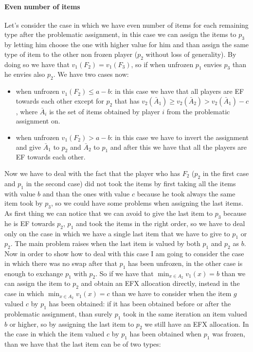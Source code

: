 \paragraph{Even number of items} Let's consider the case in which we have even number of items for each remaining type after the problematic assignment, in this case we can assign the items to $p_3$ by letting him choose the one with higher value for him and than assign the same type of item to the other non frozen player ($p_2$ without loss of generality). By doing so we have that $v_1(F_2) = v_1(F_3)$, so if when unfrozen $p_1$ envies $p_3$ than he envies also $p_2$. We have two cases now:
\begin{itemize}
\item when unfrozen $v_1(F_2) \le a-b$: in this case we have that all players are EF towards each other except for $p_2$ that has $v_2(\bar A_1) \ge v_2(\bar A_2)> v_2(\bar A_1) - c$, where $\bar A_i$ is the set of items obtained by player $i$ from the problematic assignment on.
\item when unfrozen $v_1(F_2) > a-b$: in this case we have to invert the assignment and give $\bar A_1$ to $p_2$ and $\bar A_2$ to $p_1$ and after this we have that all the players are EF towards each other.
\end{itemize}
Now we have to deal with the fact that the player who has $F_2$ ($p_2$ in the first case and $p_1$ in the second case) did not took the items by first taking all the items with value $b$ and than the ones with value $c$ because he took always the same item took by $p_3$, so we could have some problems when assigning the last items. As first thing we can notice that we can avoid to give the last item to $p_3$ because he is EF towards $p_2$, $p_1$  and took the items in the right order, so we have to deal only on the case in which we have a single last item that we have to give to $p_1$ or $p_2$. The main problem raises when the last item is valued by both $p_1$ and $p_2$ as $b$. Now in order to show how to deal with this case I am going to consider the case in which there was no swap after that $p_1$ has been unfrozen, in the other case is enough to exchange $p_1$ with $p_2$. So if we have that $\min_{x\in A_2} v_1(x) = b$ than we can assign the item to $p_2$ and obtain an EFX allocation directly, instead in the case in which $\min_{x\in A_2} v_1(x) = c$ than we have to consider when the item $g$ valued $c$ by $p_1$ has been obtained: if it has been obtained before or after the problematic assignment, than surely $p_1$ took in the same iteration an item valued $b$ or higher, so by assigning the last item to $p_2$ we still have an EFX allocation. In the case in which the item valued $c$ by $p_1$ has been obtained when $p_1$ was frozen, than we have that the last item can be of two types: 
